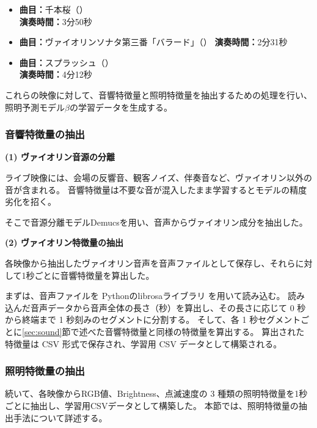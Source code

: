 \begin{itemize}
  \item \textbf{曲目：}千本桜（）　\\
      \textbf{演奏時間：}3分50秒
  \item \textbf{曲目：}ヴァイオリンソナタ第三番「バラード」（）
      \textbf{演奏時間：}2分31秒
  \item \textbf{曲目：}スプラッシュ（）　\\
      \textbf{演奏時間：}4分12秒
\end{itemize}

これらの映像に対して、音響特徴量と照明特徴量を抽出するための処理を行い、照明予測モデル$\beta$の学習データを生成する。

\subsubsection{音響特徴量の抽出} \label{sec:soundmodel}

\noindent \textbf{(1) ヴァイオリン音源の分離}

ライブ映像には、会場の反響音、観客ノイズ、伴奏音など、ヴァイオリン以外の音が含まれる。
音響特徴量は不要な音が混入したまま学習するとモデルの精度劣化を招く。

そこで音源分離モデルDemucs\cite{FacebookresearchDemucs2026}を用い、音声からヴァイオリン成分を抽出した。

\noindent \textbf{(2) ヴァイオリン特徴量の抽出}

各映像から抽出したヴァイオリン音声を音声ファイルとして保存し、それらに対して1秒ごとに音響特徴量を算出した。

まずは、音声ファイルを Pythonのlibrosaライブラリ を用いて読み込む。
読み込んだ音声データから音声全体の長さ（秒）を算出し、その長さに応じて 0 秒から終端まで 1 秒刻みのセグメントに分割する。
そして、各 1 秒セグメントごとに\ref{sec:sound}節で述べた音響特徴量と同様の特徴量を算出する。
算出された特徴量は CSV 形式で保存され、学習用 CSV データとして構築される。

\subsubsection{照明特徴量の抽出} \label{sec:lightmodel}

続いて、各映像からRGB値、Brightness、点滅速度の 3 種類の照明特徴量を1秒ごとに抽出し、学習用CSVデータとして構築した。
本節では、照明特徴量の抽出手法について詳述する。

